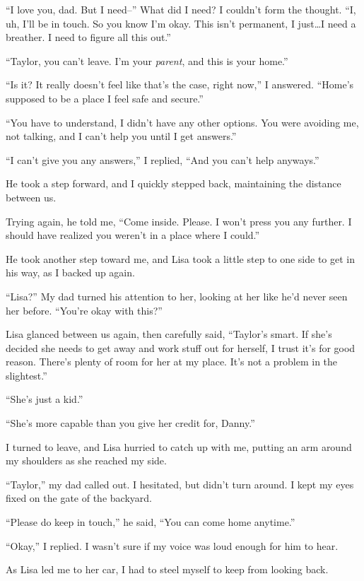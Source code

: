 ``I love you, dad.  But I need--''  What did I need?  I couldn't form the thought.  ``I, uh, I'll be in touch.  So you know I'm okay.  This isn't permanent, I just\ldots I need a breather.  I need to figure all this out.''



``Taylor, you can't leave. I'm your \emph{parent}, and this is your home.''



``Is it?  It really doesn't feel like that's the case, right now,'' I answered.  ``Home's supposed to be a place I feel safe and secure.''



``You have to understand, I didn't have any other options.  You were avoiding me, not talking, and I can't help you until I get answers.''



``I can't give you any answers,'' I replied, ``And you can't help anyways.''



He took a step forward, and I quickly stepped back, maintaining the distance between us.



Trying again, he told me, ``Come inside.  Please.  I won't press you any further.  I should have realized you weren't in a place where I could.''



He took another step toward me, and Lisa took a little step to one side to get in his way, as I backed up again.



``Lisa?'' My dad turned his attention to her, looking at her like he'd never seen her before.  ``You're okay with this?''



Lisa glanced between us again, then carefully said, ``Taylor's smart.  If she's decided she needs to get away and work stuff out for herself, I trust it's for good reason.  There's plenty of room for her at my place.  It's not a problem in the slightest.''



``She's just a kid.''



``She's more capable than you give her credit for, Danny.''



I turned to leave, and Lisa hurried to catch up with me, putting an arm around my shoulders as she reached my side.



``Taylor,'' my dad called out.  I hesitated, but didn't turn around.  I kept my eyes fixed on the gate of the backyard.



``Please do keep in touch,'' he said, ``You can come home anytime.''



``Okay,'' I replied.  I wasn't sure if my voice was loud enough for him to hear.



As Lisa led me to her car, I had to steel myself to keep from looking back.






